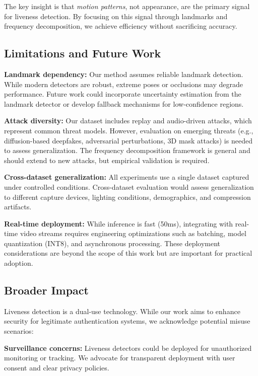 \documentclass[11pt,twocolumn]{article}
\begin{document}
The key insight is that \emph{motion patterns}, not appearance, are the primary signal for liveness detection. By focusing on this signal through landmarks and frequency decomposition, we achieve efficiency without sacrificing accuracy.

\subsection{Limitations and Future Work}

\textbf{Landmark dependency:} Our method assumes reliable landmark detection. While modern detectors are robust, extreme poses or occlusions may degrade performance. Future work could incorporate uncertainty estimation from the landmark detector or develop fallback mechanisms for low-confidence regions.

\textbf{Attack diversity:} Our dataset includes replay and audio-driven attacks, which represent common threat models. However, evaluation on emerging threats (e.g., diffusion-based deepfakes, adversarial perturbations, 3D mask attacks) is needed to assess generalization. The frequency decomposition framework is general and should extend to new attacks, but empirical validation is required.

\textbf{Cross-dataset generalization:} All experiments use a single dataset captured under controlled conditions. Cross-dataset evaluation would assess generalization to different capture devices, lighting conditions, demographics, and compression artifacts.

\textbf{Real-time deployment:} While inference is fast (50ms), integrating with real-time video streams requires engineering optimizations such as batching, model quantization (INT8), and asynchronous processing. These deployment considerations are beyond the scope of this work but are important for practical adoption.

\subsection{Broader Impact}

Liveness detection is a dual-use technology. While our work aims to enhance security for legitimate authentication systems, we acknowledge potential misuse scenarios:

\textbf{Surveillance concerns:} Liveness detectors could be deployed for unauthorized monitoring or tracking. We advocate for transparent deployment with user consent and clear privacy policies.
\end{document}
